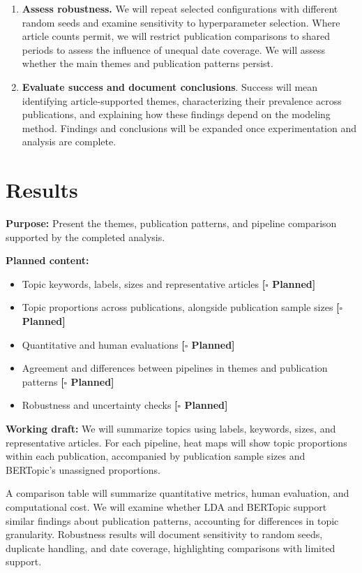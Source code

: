 \documentclass[conference]{IEEEtran}
\newcommand{\planned}{\textcolor{blue!60!black}{\textbf{[$\square$ Planned]}}}
\begin{document}
\begin{enumerate}
    \item \textbf{Assess robustness.} We will repeat selected configurations with different random seeds and examine sensitivity to hyperparameter selection. Where article counts permit, we will restrict publication comparisons to shared periods to assess the influence of unequal date coverage. We will assess whether the main themes and publication patterns persist.
    \item \textbf{Evaluate success and document conclusions}. Success will mean identifying article-supported themes, characterizing their prevalence across publications, and explaining how these findings depend on the modeling method. Findings and conclusions will be expanded once experimentation and analysis are complete.
\end{enumerate}

\section*{Results}
\textbf{Purpose:} Present the themes, publication patterns, and pipeline comparison supported by the completed analysis.

\textbf{Planned content:} 
\begin{itemize}
    \item Topic keywords, labels, sizes and representative articles \planned
    \item Topic proportions across publications, alongside publication sample sizes \planned
    \item Quantitative and human evaluations \planned
    \item Agreement and differences between pipelines in themes and publication patterns \planned
    \item Robustness and uncertainty checks \planned
\end{itemize}

\textbf{Working draft:} We will summarize topics using labels, keywords, sizes, and representative articles. For each pipeline, heat maps will show topic proportions within each publication, accompanied by publication sample sizes and BERTopic’s unassigned proportions. 

A comparison table will summarize quantitative metrics, human evaluation, and computational cost. We will examine whether LDA and BERTopic support similar findings about publication patterns, accounting for differences in topic granularity. Robustness results will document sensitivity to random seeds, duplicate handling, and date coverage, highlighting comparisons with limited support.
\end{document}
